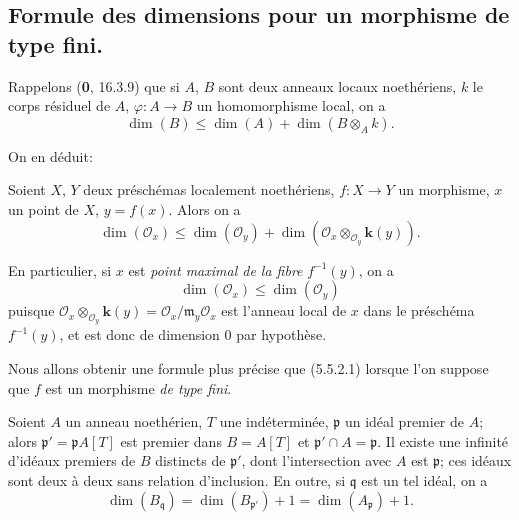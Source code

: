 \subsection{Formule des dimensions pour un morphisme de type fini.}
\label{IV.2.s5.5-fr}

\begin{env}[5.5.1]
\label{IV.2.s5.5.1-fr}
Rappelons (\textbf{0}, 16.3.9) que si $A$, $B$ sont deux anneaux locaux noethériens,
$k$ le corps résiduel de $A$, $\varphi:A\to B$ un homomorphisme local, on a
\begin{equation}
\dim(B)\leq\dim(A)+\dim(B\otimes_A k).
\tag{5.5.1.1}\label{IV.2.s5.5.1.1-fr}
\end{equation}
\end{env}

On en déduit:

\begin{proposition}[5.5.2]
\label{IV.2.s5.5.2-fr}
Soient $X$, $Y$ deux préschémas localement noethériens, $f:X\to Y$ un
morphisme, $x$ un point de $X$, $y=f(x)$. Alors on a
\begin{equation}
\dim(\mathcal O_x)\leq\dim(\mathcal O_y)
+\dim(\mathcal O_x\otimes_{\mathcal O_y}\boldsymbol{k}(y)).
\tag{5.5.2.1}\label{IV.2.s5.5.2.1-fr}
\end{equation}
\end{proposition}


En particulier, si $x$ est \emph{point maximal de la fibre} $f^{-1}(y)$, on a
\begin{equation}
\dim(\mathcal O_x)\leq\dim(\mathcal O_y)
\tag{5.5.2.2}\label{IV.2.s5.5.2.2-fr}
\end{equation}
puisque $\mathcal O_x\otimes_{\mathcal O_y}\boldsymbol{k}(y)
=\mathcal O_x/\mathfrak m_y\mathcal O_x$ est l'anneau local de $x$ dans le
préschéma $f^{-1}(y)$, et est donc de dimension $0$ par hypothèse.

Nous allons obtenir une formule plus précise que (5.5.2.1) lorsque l'on
suppose que $f$ est un morphisme \emph{de type fini}.

\begin{proposition}[5.5.3]
\label{IV.2.s5.5.3-fr}
Soient $A$ un anneau noethérien, $T$ une indéterminée, $\mathfrak p$ un idéal
premier de $A$; alors $\mathfrak p'=\mathfrak pA[T]$ est premier dans
$B=A[T]$ et $\mathfrak p'\cap A=\mathfrak p$. Il existe une infinité
d'idéaux premiers de $B$ distincts de $\mathfrak p'$, dont l'intersection
avec $A$ est $\mathfrak p$; ces idéaux sont deux à deux sans relation
d'inclusion. En outre, si $\mathfrak q$ est un tel idéal, on a
\begin{equation}
\dim(B_{\mathfrak q})=\dim(B_{\mathfrak p'})+1
=\dim(A_{\mathfrak p})+1.
\tag{5.5.3.1}\label{IV.2.s5.5.3.1-fr}
\end{equation}
\end{proposition}

